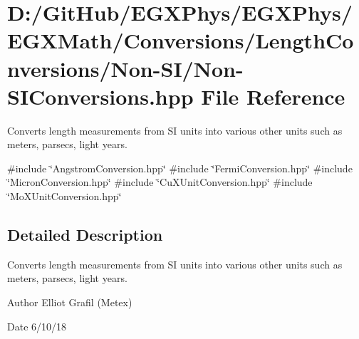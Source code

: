 \hypertarget{_non-_s_i_conversions_8hpp}{}\section{D\+:/\+Git\+Hub/\+E\+G\+X\+Phys/\+E\+G\+X\+Phys/\+E\+G\+X\+Math/\+Conversions/\+Length\+Conversions/\+Non-\/\+S\+I/\+Non-\/\+S\+I\+Conversions.hpp File Reference}
\label{_non-_s_i_conversions_8hpp}


Converts length measurements from SI units into various other units such as meters, parsecs, light years.  


{\ttfamily \#include \char`\"{}Angstrom\+Conversion.\+hpp\char`\"{}}\newline
{\ttfamily \#include \char`\"{}Fermi\+Conversion.\+hpp\char`\"{}}\newline
{\ttfamily \#include \char`\"{}Micron\+Conversion.\+hpp\char`\"{}}\newline
{\ttfamily \#include \char`\"{}Cu\+X\+Unit\+Conversion.\+hpp\char`\"{}}\newline
{\ttfamily \#include \char`\"{}Mo\+X\+Unit\+Conversion.\+hpp\char`\"{}}\newline


\subsection{Detailed Description}
Converts length measurements from SI units into various other units such as meters, parsecs, light years. 

\begin{DoxyAuthor}{Author}
Elliot Grafil (Metex) 
\end{DoxyAuthor}
\begin{DoxyDate}{Date}
6/10/18 
\end{DoxyDate}
